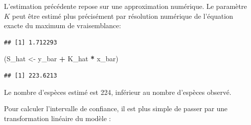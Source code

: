 \documentclass[
  11pt,
  american,
  a4paper,
  extrafontsizes,onecolumn,openright
  ]{memoir}
\newenvironment{Shaded}{\begin{snugshade}}{\end{snugshade}}
\newcommand{\CommentTok}[1]{\textcolor[rgb]{0.56,0.35,0.01}{\textit{#1}}}
\newcommand{\ControlFlowTok}[1]{\textcolor[rgb]{0.13,0.29,0.53}{\textbf{#1}}}
\newcommand{\DecValTok}[1]{\textcolor[rgb]{0.00,0.00,0.81}{#1}}
\newcommand{\FloatTok}[1]{\textcolor[rgb]{0.00,0.00,0.81}{#1}}
\newcommand{\FunctionTok}[1]{\textcolor[rgb]{0.13,0.29,0.53}{\textbf{#1}}}
\newcommand{\NormalTok}[1]{#1}
\newcommand{\OtherTok}[1]{\textcolor[rgb]{0.56,0.35,0.01}{#1}}
\newcommand{\SpecialCharTok}[1]{\textcolor[rgb]{0.81,0.36,0.00}{\textbf{#1}}}
\begin{document}
L'estimation précédente repose sur une approximation numérique.
Le paramètre \(K\) peut être estimé plus précisément par résolution numérique de l'équation exacte du maximum de vraisemblance:

\scriptsize

\begin{Shaded}
\end{Shaded}

\begin{verbatim}
## [1] 1.712293
\end{verbatim}

\begin{Shaded}
\begin{Highlighting}[]
\NormalTok{(S\_hat }\OtherTok{\textless{}{-}}\NormalTok{ y\_bar }\SpecialCharTok{+}\NormalTok{ K\_hat }\SpecialCharTok{*}\NormalTok{ x\_bar)}
\end{Highlighting}
\end{Shaded}

\begin{verbatim}
## [1] 223.6213
\end{verbatim}

\normalsize

Le nombre d'espèces estimé est 224, inférieur au nombre d'espèces observé.

Pour calculer l'intervalle de confiance, il est plus simple de passer par une transformation linéaire du modèle \autocite{Lineweaver1934}:
\end{document}
